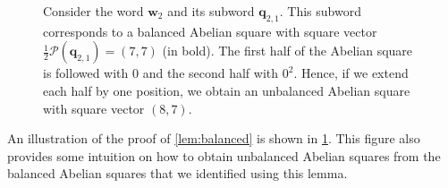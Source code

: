 \documentclass{article}
\theoremstyle{plain}
\theoremstyle{definition}
\theoremstyle{remark}
\renewcommand{\P}{\mathcal{P}}
\newcommand{\ww}{\mathbf{w}}
\newcommand{\qq}{\mathbf{q}}
\begin{document}
  \begin{figure}[b]
    \centering
     \caption{
      Consider the word $\ww_2$ and its subword $\qq_{2,1}$.
      This subword corresponds to a balanced Abelian square with square vector
      $\frac{1}{2}\P(\qq_{2,1}) = (7,7)$ (in bold).
      The first half of the Abelian square is followed with $0$ and the second half with $0^2$.
      Hence, if we extend each half by one position, we obtain an unbalanced Abelian square
      with square vector $(8,7)$.
    }\label{fig:lb}
  \end{figure}

  
  An illustration of the proof of \cref{lem:balanced} is shown in \cref{fig:lb}.
  This figure also provides some intuition on how to obtain unbalanced Abelian squares
  from the balanced Abelian squares that we identified using this lemma.
  
\end{document}
